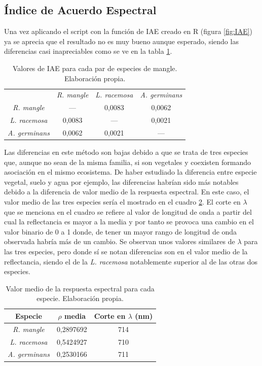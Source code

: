 \subsection{Índice de Acuerdo Espectral}
Una vez aplicando el script con la función de \ac{IAE} creado en R (figura \ref{fig:IAE}) ya se aprecia que el resultado no es muy bueno aunque esperado, siendo las diferencias casi inapreciables como se ve en la tabla \ref{tab:Valores_IAE}.%

\begin{table}[ht]
	\centering
	\begin{tabular}{@{}cccc@{}}
	\toprule
	& \textit{R. mangle} & \textit{L. racemosa} & \textit{A. germinans} \\
	\textit{R. mangle} & --- & 0,0083 & 0,0062 \\
	\textit{L. racemosa} & 0,0083 & --- & 0,0021 \\
	\textit{A. germinans} & 0,0062 & 0,0021 & --- \\
	\bottomrule[0.4mm]
	\end{tabular}
	\caption[Valores de IAE]{Valores de \ac{IAE} para cada par de especies de mangle. Elaboración propia.}
	\label{tab:Valores_IAE}
\end{table}

Las diferencias en este método son bajas debido a que se trata de tres especies que, aunque no sean de la misma familia, si son vegetales y coexisten formando asociación en el mismo ecosistema. De haber estudiado la diferencia entre especie vegetal, suelo y agua por ejemplo, las diferencias habrían sido más notables debido a la diferencia de valor medio de la respuesta espectral. En este caso, el valor medio de las tres especies sería el mostrado en el cuadro \ref{tab:mediaIAE}. El corte en $\lambda$ que se menciona en el cuadro se refiere al valor de longitud de onda a partir del cual la reflectancia es mayor a la media y por tanto se provoca una cambio en el valor binario de 0 a 1 donde, de tener un mayor rango de longitud de onda observada habría más de un cambio. Se observan unos valores similares de $\lambda$ para las tres especies, pero donde sí se notan diferencias son en el valor medio de la reflectancia, siendo el de la \textit{L. racemosa} notablemente superior al de las otras dos especies.%

\begin{table}
	\centering
	\begin{tabular}{@{}ccc@{}}
	\toprule[0.4mm]
	Especie & $\rho$ media & Corte en $\lambda$ (nm)\\
	\midrule
	\textit{R. mangle} & 0,2897692 & 714	\\
	\textit{L. racemosa} & 0,5424927 & 710\\
	\textit{A. germinans} & 0,2530166 & 711\\
	\bottomrule
	\end{tabular}
	\caption[Valores medios de la respuesta espectral]{Valor medio de la respuesta espectral para cada especie. Elaboración propia.}
	\label{tab:mediaIAE}
\end{table}

